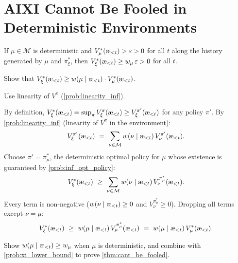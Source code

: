 \documentclass[fontsize=11pt, parskip=half]{scrartcl}
\newcommand{\cM}{\mathcal{M}}
\newcommand{\aes}{\textnormal{\ae}}
\begin{document}
\section{AIXI Cannot Be Fooled in Deterministic Environments}\label{prob:cant_be_fooled}

\begin{theorem}\label{thm:cant_be_fooled}
If $\mu \in \cM$ is deterministic and $V_\mu^*(\aes_{<t}) > \varepsilon > 0$ for all $t$ along the history generated by $\mu$ and $\pi_\xi^*$, then $V_\xi^*(\aes_{<t}) \geq w_\mu\, \varepsilon > 0$ for all $t$. \cite[Theorem 7.4.10]{Hutter:24uaibook2}
\end{theorem}

\begin{exercise}
\label{prob:xi_lower_bound}
Show that $V_\xi^*(\aes_{<t}) \geq w(\mu \mid \aes_{<t}) \cdot V_\mu^*(\aes_{<t})$.


\begin{hint}
Use linearity of $V^\pi$ (\cref{prob:linearity_inf}).
\end{hint}
\end{exercise}

\begin{solution}
By definition, $V_\xi^*(\aes_{<t}) = \sup_\pi V_\xi^\pi(\aes_{<t}) \geq V_\xi^{\pi'}(\aes_{<t})$ for any policy $\pi'$.
By \cref{prob:linearity_inf} (linearity of $V^\pi$ in the environment):
\[
    V_\xi^{\pi'}(\aes_{<t}) ~=~ \sum_{\nu \in \cM} w(\nu \mid \aes_{<t})\, V_\nu^{\pi'}(\aes_{<t}).
\]
Choose $\pi' = \pi_\mu^*$, the deterministic optimal policy for $\mu$ whose existence is guaranteed by \cref{prob:inf_opt_policy}:
\[
    V_\xi^*(\aes_{<t}) ~\geq~ \sum_{\nu \in \cM} w(\nu \mid \aes_{<t})\, V_\nu^{\pi_\mu^*}(\aes_{<t}).
\]
Every term is non-negative ($w(\nu \mid \aes_{<t}) \geq 0$ and $V_\nu^{\pi_\mu^*} \geq 0$). Dropping all terms except $\nu = \mu$:
\[
    V_\xi^*(\aes_{<t})
    ~\geq~ w(\mu \mid \aes_{<t})\, V_\mu^{\pi_\mu^*}(\aes_{<t})
    ~=~ w(\mu \mid \aes_{<t})\, V_\mu^*(\aes_{<t}).
\]
\end{solution}

\begin{exercise}
\label{prob:auto5}
Show $w(\mu \mid \aes_{<t}) \geq w_\mu$ when $\mu$ is deterministic, and combine with \cref{prob:xi_lower_bound} to prove \cref{thm:cant_be_fooled}.

\end{exercise}
\end{document}
